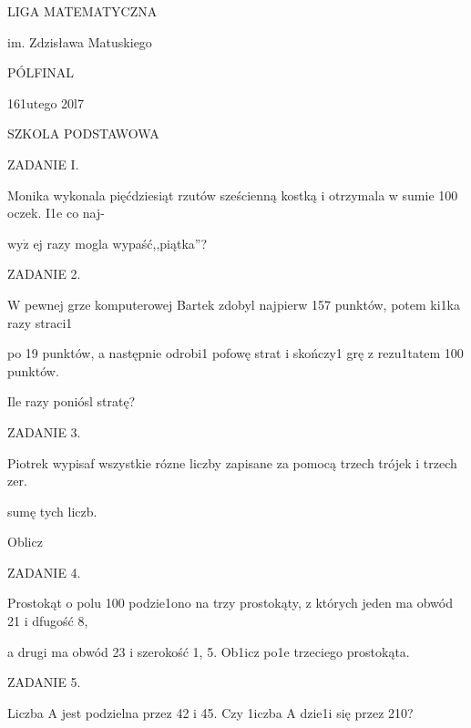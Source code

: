 \documentclass[a4paper,12pt]{article}
\begin{document}
LIGA MATEMATYCZNA

im. Zdzisława Matuskiego

PÓLFINAL

161utego 20l7

SZKOLA PODSTAWOWA

ZADANIE I.

Monika wykonala pięćdziesiąt rzutów sześcienną kostką i otrzymala w sumie 100 oczek. I1e co naj-

$\mathrm{w}\mathrm{y}\dot{\mathrm{z}}$ ej razy mogla wypaść,,piątka''?

ZADANIE 2.

$\mathrm{W}$ pewnej grze komputerowej Bartek zdobyl najpierw 157 punktów, potem ki1ka razy straci1

po 19 punktów, a następnie odrobi1 pofowę strat i skończy1 grę z rezu1tatem 100 punktów.

Ile razy poniósl stratę?

ZADANIE 3.

Piotrek wypisaf wszystkie rózne liczby zapisane za pomocą trzech trójek i trzech zer.

sumę tych liczb.

Oblicz

ZADANIE 4.

Prostokąt o polu 100 podzie1ono na trzy prostokąty, z których jeden ma obwód 21 i dfugość 8,

a drugi ma obwód 23 i szerokość 1, 5. Ob1icz po1e trzeciego prostokąta.

ZADANIE 5.

Liczba A jest podzielna przez 42 i 45. Czy 1iczba A dzie1i się przez 210?
\end{document}
